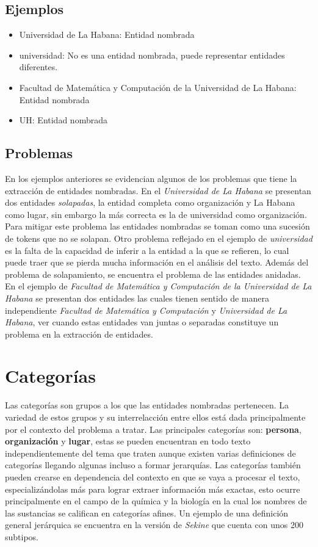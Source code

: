 \documentclass[runningheads]{llncs}
\begin{document}
\subsection{Ejemplos}

\begin{itemize}

\item Universidad de La Habana: Entidad nombrada
\item universidad: No es una entidad nombrada, puede representar entidades diferentes.
\item Facultad de Matemática y Computación de la Universidad de La Habana: Entidad nombrada
\item UH: Entidad nombrada
\end{itemize}

\subsection{Problemas}

En los ejemplos anteriores se evidencian algunos de los problemas que tiene la extracción de entidades nombradas. En el \emph{Universidad de La Habana} se presentan dos entidades \emph{solapadas}, la entidad completa como organización y La Habana como lugar, sin embargo la más correcta es la de universidad como organización. Para mitigar este problema las entidades nombradas se toman como una sucesión de tokens que no se solapan. Otro problema reflejado en el ejemplo de \emph{universidad} es la falta de la capacidad de inferir a la entidad a la que se refieren, lo cual puede traer que se pierda mucha información en el análisis del texto. Además del problema de solapamiento, se encuentra el problema de las entidades anidadas. En el ejemplo de \emph{Facultad de Matemática y Computación de la Universidad de La Habana} se presentan dos entidades las cuales tienen sentido de manera independiente \emph{Facultad de Matemática y Computación} y \emph{Universidad de La Habana}, ver cuando estas entidades van juntas o separadas constituye un problema en la extracción de entidades.

\section{Categorías}

Las categorías son grupos a los que las entidades nombradas pertenecen. La variedad de estos grupos y su interrelacción entre ellos está dada principalmente por el contexto del problema a tratar. Las principales categorías son: \textbf{persona}, \textbf{organización} y \textbf{lugar}, estas se pueden encuentran en todo texto independientemente del tema que traten aunque existen varias definiciones de categorías llegando algunas incluso a formar jerarquías. Las categorías también pueden crearse en dependencia del contexto en que se vaya a procesar el texto, especializándolas más para lograr extraer información más exactas, esto ocurre principalmente en el campo de la química y la biología en la cual los nombres de las sustancias se califican en categorías afines. Un ejemplo de una definición general jerárquica se encuentra en la versión de \emph{Sekine}\cite{sekine} que cuenta con unos 200 subtipos.
\end{document}
